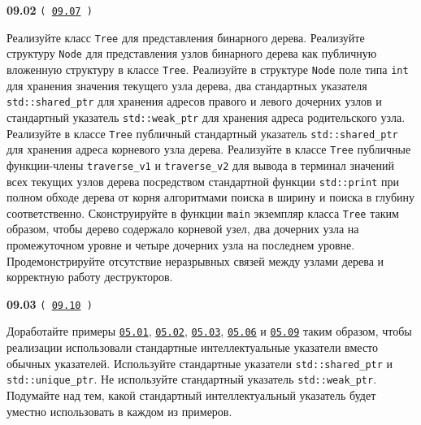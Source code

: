 \documentclass[a4paper,12pt]{article}
\begin{document}
\bigskip

{\large \textbf{09.02} \texttt{(\,\href{https://github.com/i-s-m-mipt/Education/blob/master/projects/examples/source/09.07.cpp}{09.07}\,)}}

\bigskip

Реализуйте класс \lstinline{Tree} для представления бинарного дерева. Реализуйте структуру \lstinline{Node} для представления узлов бинарного дерева как публичную вложенную структуру в классе \lstinline{Tree}. Реализуйте в структуре \lstinline{Node} поле типа \lstinline{int} для хранения значения текущего узла дерева, два стандартных указателя \lstinline{std::shared_ptr} для хранения адресов правого и левого дочерних узлов и стандартный указатель \lstinline{std::weak_ptr} для хранения адреса родительского узла. Реализуйте в классе \lstinline{Tree} публичный стандартный  указатель \lstinline{std::shared_ptr} для хранения адреса корневого узла дерева. Реализуйте в классе \lstinline{Tree} публичные функции-члены \lstinline{traverse_v1} и \lstinline{traverse_v2} для вывода в терминал значений всех текущих узлов дерева посредством стандартной функции \lstinline{std::print} при полном обходе дерева от корня алгоритмами поиска в ширину и поиска в глубину соответственно. Сконструируйте в функции \lstinline{main} экземпляр класса \lstinline{Tree} таким образом, чтобы дерево содержало корневой узел, два дочерних узла на промежуточном уровне и четыре дочерних узла на последнем уровне. Продемонстрируйте отсутствие неразрывных связей между узлами дерева и корректную работу деструкторов.

\bigskip

{\large \textbf{09.03} \texttt{(\,\href{https://github.com/i-s-m-mipt/Education/blob/master/projects/examples/source/09.10.cpp}{09.10}\,)}}

\bigskip

Доработайте примеры \href{https://github.com/i-s-m-mipt/Education/blob/master/projects/examples/source/05.01.cpp}{\texttt{05.01}}, \href{https://github.com/i-s-m-mipt/Education/blob/master/projects/examples/source/05.02.cpp}{\texttt{05.02}}, \href{https://github.com/i-s-m-mipt/Education/blob/master/projects/examples/source/05.03.cpp}{\texttt{05.03}}, \href{https://github.com/i-s-m-mipt/Education/blob/master/projects/examples/source/05.06.cpp}{\texttt{05.06}} и \href{https://github.com/i-s-m-mipt/Education/blob/master/projects/examples/source/05.09.cpp}{\texttt{05.09}} таким образом, чтобы реализации использовали стандартные интеллектуальные указатели вместо обычных указателей. Используйте стандартные указатели \lstinline{std::shared_ptr} и \lstinline{std::unique_ptr}. Не используйте стандартный указатель \lstinline{std::weak_ptr}. Подумайте над тем, какой стандартный интеллектуальный указатель будет уместно использовать в каждом из примеров.
\end{document}
